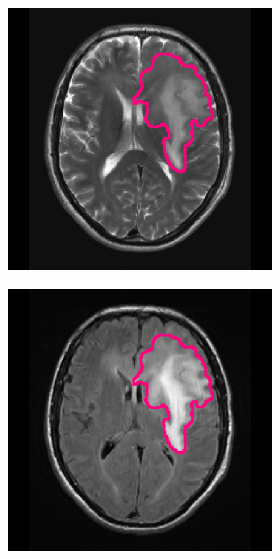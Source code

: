 \begin{subappendices}
\begin{figure}[htbp]
\begin{subfigure}[b]{0.95\textwidth}
\begin{subfigure}[b]{0.215\textwidth}
        \end{subfigure}
        \hfill
        \begin{subfigure}[b]{0.215\textwidth}
        \includegraphics[width=\textwidth, clip, trim=2.5cm 0.5cm 2.5cm 0.5cm]{Figures/Random_segs/T2_TCGA-HT-8106.png}
        \end{subfigure}
        \hfill
        \begin{subfigure}[b]{0.215\textwidth}
        \includegraphics[width=\textwidth, clip, trim=2.5cm 0.5cm 2.5cm 0.5cm]{Figures/Random_segs/FLAIR_TCGA-HT-8106.png}

\end{subfigure}
\end{subfigure}
\end{figure}
\end{subappendices}
